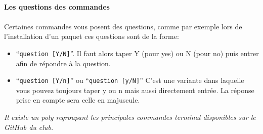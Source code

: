 \paragraph{Les questions des commandes}

\paragraph{} Certaines commandes vous posent des questions, comme par exemple
lors de l'installation d'un paquet ces questions sont de la forme:

\begin{itemize}
	\item ``\texttt{question [Y/N]}''. Il faut alors taper Y (pour yes) ou N
		(pour no) puis entrer afin de répondre à la question.
	\item ``\texttt{question [Y/n]}'' ou ``\texttt{question [y/N]}'' C'est une
		variante dans laquelle vous pouvez toujours taper y ou n
		mais aussi directement entrée. La réponse prise en compte sera celle en
		majuscule.\newline
\end{itemize}

\textit{Il existe un poly regroupant les principales commandes terminal
disponibles sur le GitHub du club.}
